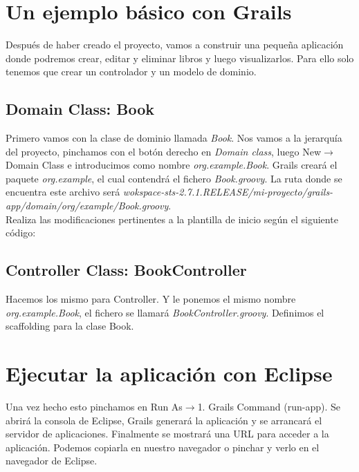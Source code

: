 \documentclass[a4paper,12pt,spanish]{article}
\begin{document}
\section{Un ejemplo básico con Grails}

Después de haber creado el proyecto, vamos a construir una pequeña aplicación donde podremos crear, editar y eliminar libros y luego visualizarlos. Para ello solo tenemos que crear un controlador y un modelo de dominio.

\subsection{Domain Class: Book}

Primero vamos con la clase de dominio llamada {\it Book}. Nos vamos a la jerarquía del proyecto, pinchamos con el botón derecho en {\it Domain class}, luego New$\rightarrow$Domain Class e introducimos como nombre {\it org.example.Book}. Grails creará el paquete {\it org.example}, el cual contendrá el fichero {\it Book.groovy}. La ruta donde se encuentra este archivo será {\it wokspace-sts-2.7.1.RELEASE/mi-proyecto/grails-app/domain/org/example/Book.groovy}.\\

Realiza las modificaciones pertinentes a la plantilla de inicio según el siguiente código:



\subsection{Controller Class: BookController}

Hacemos los mismo para Controller. Y le ponemos el mismo nombre {\it org.example.Book}, el fichero se llamará {\it BookController.groovy}.
Definimos el scaffolding para la clase Book.



\section{Ejecutar la aplicación con Eclipse}

Una vez hecho esto pinchamos en Run As$\rightarrow$1. Grails Command (run-app). Se abrirá la consola de Eclipse, Grails generará la aplicación y se arrancará el servidor de aplicaciones. Finalmente se mostrará una URL para acceder a la aplicación. Podemos copiarla en nuestro navegador o pinchar y verlo en el navegador de Eclipse.
\end{document}

